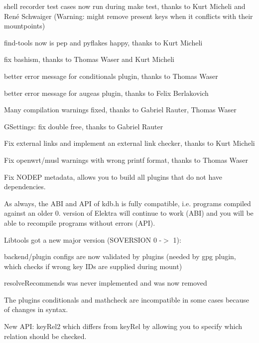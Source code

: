 \begin{DoxyItemize}
\item shell recorder test cases now run during {\ttfamily make test}, thanks to Kurt Micheli and René Schwaiger (Warning\+: might remove present keys when it conflicts with their mountpoints)
\item find-\/tools now is pep and pyflakes happy, thanks to Kurt Micheli
\item fix bashism, thanks to Thomas Waser and Kurt Micheli
\item better error message for conditionals plugin, thanks to Thomas Waser
\item better error message for augeas plugin, thanks to Felix Berlakovich
\item Many compilation warnings fixed, thanks to Gabriel Rauter, Thomas Waser
\item G\+Settings\+: fix double free, thanks to Gabriel Rauter
\item Fix external links and implement an external link checker, thanks to Kurt Micheli
\item Fix openwrt/musl warnings with wrong printf format, thanks to Thomas Waser
\item Fix N\+O\+D\+EP metadata, allows you to build all plugins that do not have dependencies.
\end{DoxyItemize}

As always, the A\+BI and A\+PI of kdb.\+h is fully compatible, i.\+e. programs compiled against an older 0. version of Elektra will continue to work (A\+BI) and you will be able to recompile programs without errors (A\+PI).

Libtools got a new major version (S\+O\+V\+E\+R\+S\+I\+ON 0 -\/$>$ 1)\+:


\begin{DoxyItemize}
\item backend/plugin configs are now validated by plugins (needed by gpg plugin, which checks if wrong key I\+Ds are supplied during mount)
\item resolve\+Recommends was never implemented and was now removed
\end{DoxyItemize}

The plugins conditionals and mathcheck are incompatible in some cases because of changes in syntax.

New A\+PI\+: {\ttfamily key\+Rel2} which differs from {\ttfamily key\+Rel} by allowing you to specify which relation should be checked.


